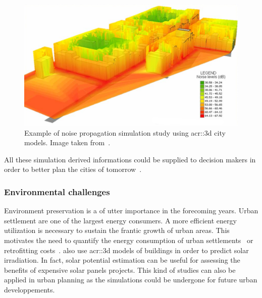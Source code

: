             \begin{figure}[htpb]
                \centering
                \includegraphics[width=\textwidth]{images/introduction/3d_model_applications/noise_simulation}
                \caption[
                    Example of noise propagation simulation study using \acrshort*{acr::3d} city models.
                ]{
                    \label{fig::noise_propogation}
                    Example of noise propagation simulation study using \gls{acr::3d} city models.
                    Image taken from~\parencite{kurakula2007gis}.
                }
            \end{figure}

            All these simulation derived informations could be supplied to decision makers in order to better plan the cities of tomorrow~\parencite{huck2019urban}.

        \subsubsection{Environmental challenges}
            Environment preservation is a of utter importance in the forecoming years.
            Urban settlement are one of the largest energy consumers.
            A more efficient energy utilization is necessary to sustain the frantic growth of urban areas.
            This motivates the need to quantify the energy consumption of urban settlements~\parencite{wate20153d} or retrofitting costs~\parencite{previtali2014automatic}.
            \textcite{biljecki2015propagation} also use \gls{acr::3d} models of buildings in order to predict solar irradiation.
            In fact, solar potential estimation can be useful for assessing the benefits of expensive solar panels projects.
            This kind of studies can also be applied in urban planning as the simulations could be undergone for future urban developpements.

